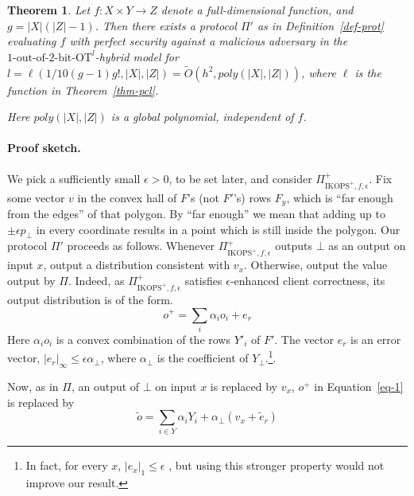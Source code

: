 \documentclass[a4paper]{article}
\newtheorem{theorem}{Theorem}[section]
\newcommand{\OT}[2]{#1\text{-out-of-}#2\text{-bit-OT}}
\newcommand{\atodo}[1]{\textcolor{purple}{TODO: #1}}
\begin{document}
\begin{theorem}\label{thm-main}
Let $f:X\times Y\rightarrow Z$ denote a full-dimensional function, and
$g=|X|(|Z|-1)$.
Then there exists a protocol $\Pi'$ as in Definition~\ref{def-prot} evaluating $f$ with perfect security against a malicious adversary in the ${\OT{1}{2}}^l$-hybrid model
for $l=\ell(1/10(g-1)g!, |X|, |Z|)=\tilde{O}(h^2,poly(|X|,|Z|))$, where $\ell$ is the function in Theorem~\ref{thm-pcl}.
 

Here $poly(|X|,|Z|)$ is a global polynomial, independent of $f$.%

\end{theorem}

\paragraph{Proof sketch.}

We pick a sufficiently small $\epsilon>0$, to be set later, and consider $\Pi^+_{\text{IKOPS}^+,f,\epsilon}$. Fix some vector $v$ in the convex hall of $F$'s (not $F'$'s) rows $F_y$, which is ``far enough from the edges'' of that polygon.
By ``far enough'' we mean that adding up to $\pm\epsilon p_\bot$ in every coordinate
results in a point which is still inside the polygon.
Our protocol $\Pi'$ proceeds as follows. Whenever $\Pi^+_{\text{IKOPS}^+,f,\epsilon}$ outputs $\bot$ as an output on input $x$, output  a distribution consistent with $v_x$. Otherwise, output the value output by $\Pi$. 
Indeed, as $\Pi^+_{\text{IKOPS}^+,f,\epsilon}$ satisfies $\epsilon$-enhanced client correctness, its output distribution 
is of the form.
\begin{equation}\label{eq-1}
o^+ = \sum_i\alpha_i o_i + e_r
\end{equation}
Here $\alpha_i o_i$ is a convex combination of the rows $Y'_i$ of $F'$.
The vector $e_r$ is an error vector, $|e_r|_\infty\leq \epsilon\alpha_\bot$, where $\alpha_\bot$ is the coefficient of $Y_\bot$.\footnote{In fact, for every $x$, $|e_x|_1\leq \epsilon$ , but using this stronger property would not improve our result.}.

Now, as in $\Pi$, an output of $\bot$ on input $x$ is replaced by $v_x$,
$o^+$ in Equation~\ref{eq-1} is replaced by
\begin{equation}
\tilde{o} = \sum_{i\in Y}\alpha_i Y_i + \alpha_\bot (v_x+\tilde{e}_r)
\end{equation}
\end{document}
